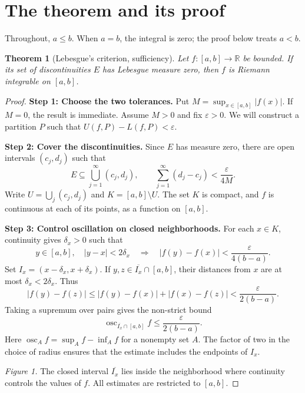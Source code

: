 \documentclass[11pt]{article}
\newtheorem{theorem}{Theorem}
\newcommand{\R}{\mathbb R}
\DeclareMathOperator{\osc}{osc}
\begin{document}
\section{The theorem and its proof}
Throughout, $a\leq b$. When $a=b$, the integral is zero; the proof below treats $a<b$.
\begin{theorem}[Lebesgue's criterion, sufficiency]
Let $f:[a,b]\to\R$ be bounded. If its set of discontinuities $E$ has Lebesgue measure zero, then $f$ is Riemann integrable on $[a,b]$.
\end{theorem}
\begin{proof}
\textbf{Step 1: Choose the two tolerances.}
Put $M=\sup_{x\in[a,b]}|f(x)|$. If $M=0$, the result is immediate. Assume $M>0$ and fix $\varepsilon>0$. We will construct a partition $P$ such that $U(f,P)-L(f,P)<\varepsilon$.

\textbf{Step 2: Cover the discontinuities.}
Since $E$ has measure zero, there are open intervals $(c_j,d_j)$ such that
\[
 E\subseteq\bigcup_{j=1}^{\infty}(c_j,d_j),
 \qquad \sum_{j=1}^{\infty}(d_j-c_j)<\frac{\varepsilon}{4M}.
\]
Write $U=\bigcup_j(c_j,d_j)$ and $K=[a,b]\setminus U$. The set $K$ is compact, and $f$ is continuous at each of its points, as a function on $[a,b]$.

\textbf{Step 3: Control oscillation on closed neighborhoods.}
For each $x\in K$, continuity gives $\delta_x>0$ such that
\[
 y\in[a,b],\quad |y-x|<2\delta_x
 \quad\Longrightarrow\quad
 |f(y)-f(x)|<\frac{\varepsilon}{4(b-a)}.
\]
Set $I_x=(x-\delta_x,x+\delta_x)$. If $y,z\in\overline{I_x}\cap[a,b]$, their distances from $x$ are at most $\delta_x<2\delta_x$. Thus
\[
 |f(y)-f(z)|\leq |f(y)-f(x)|+|f(x)-f(z)|
 <\frac{\varepsilon}{2(b-a)}.
\]
Taking a supremum over pairs gives the non-strict bound
\[
 \osc_{\overline{I_x}\cap[a,b]}f\leq\frac{\varepsilon}{2(b-a)}.
\]
Here $\osc_A f=\sup_A f-\inf_A f$ for a nonempty set $A$. The factor of two in the choice of radius ensures that the estimate includes the endpoints of $I_x$.

\begin{center}
\end{center}
\textit{Figure 1.} The closed interval $\overline{I_x}$ lies inside the neighborhood where continuity controls the values of $f$. All estimates are restricted to $[a,b]$.


\end{proof}
\end{document}
